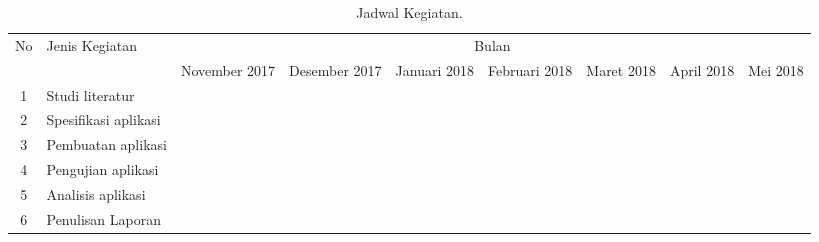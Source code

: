 \begin{table}[H]
	\caption{Jadwal Kegiatan.}
	
	\begin{center}
		\resizebox{\textwidth}{!}
		{\begin{tabular}{|c|p{5cm}|p{2cm}|p{2cm}|p{2cm}|p{2cm}|p{2cm}|p{2cm}|p{2cm}|}
				\hline 
				\multirow{2}{*}{No} & \multirow{2}{*}{Jenis Kegiatan} & \multicolumn{7}{c|}{Bulan}
				\tabularnewline
				
				\cline{3-9} 
				&  & November 2017 & Desember 2017 & Januari 2018 & Februari 2018 & Maret 2018 & April 2018 & Mei 2018
				\tabularnewline
				
				\hline 
				1 & Studi literatur & \cellcolor{cyan} & \cellcolor{cyan} &  &  &  &  & \tabularnewline
				
				\hline 
				2 & Spesifikasi aplikasi &  & \cellcolor{red} &  &  &  &  & \tabularnewline
				
				\hline 
				3 & Pembuatan aplikasi &&  
				\cellcolor{green} & \cellcolor{green} & \cellcolor{green} & \cellcolor{green} &  & \tabularnewline
				
				\hline 
				4 & Pengujian aplikasi &  &  &  &  & \cellcolor{darkgray} & \cellcolor{darkgray} & \tabularnewline
				
				\hline 
				5 & Analisis aplikasi &  &  &  &  &  & \cellcolor{lightgray} & \cellcolor{lightgray} \tabularnewline
				
				\hline 
				6 & Penulisan Laporan & \cellcolor{yellow} & \cellcolor{yellow} & \cellcolor{yellow} & \cellcolor{yellow} & \cellcolor{yellow} & \cellcolor{yellow} & \cellcolor{yellow} 
				\tabularnewline
				
				\hline 
		\end{tabular}}
		\par\end{center}
\end{table}